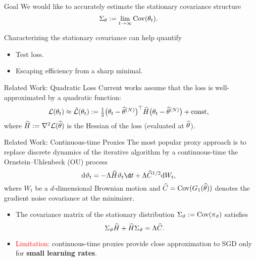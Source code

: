 \documentclass[10pt,xcolor=table]{beamer}
\begin{document}
\begin{frame}{Goal}
We would like to accurately estimate the stationary covariance structure 
\begin{equation*}
\Sigma_{\theta} \defas \lim_{t \to \infty} \text{Cov} (\theta_{t}).
\end{equation*}

Characterizing the stationary covariance can help quantify 
\begin{itemize}
     \item Test loss.
     \item Escaping efficiency from a sharp minimal. 
\end{itemize}
\end{frame}

\begin{frame}{Related Work: Quadratic Loss}
	Current works assume that the loss is well-approximated by a quadratic function:
	\begin{equation*}
		\textstyle\loss(\theta_{t}) \approx \tilde{\loss}(\theta_{t}) := \frac{1}{2} \rbra[\big]{\theta_{t}-\MLEN}^{\top} \hess \rbra[\big]{\theta_{t}-\MLEN} + \mathrm{const},
	\end{equation*}
	where $\hess \defas \grad^{2} \loss(\MLE)$ is the Hessian of the loss (evaluated at $\MLE$). 
\end{frame}

\begin{frame}{Related Work: Continuous-time Proxies}
The most popular proxy approach is to replace discrete dynamics of the iterative algorithm by a continuous-time the Ornstein--Uhlenbeck (OU) process
$$
	\dee \vartheta_{t} = -\Lambda \hess \vartheta_{t} \d t + \Lambda \widehat{C}^{1/2} \dee W_{t},
$$
where $W_{t}$ be a $d$-dimensional Brownian motion and $\widehat{C} = \cov(G_{1}(\MLE))$ denotes the gradient noise covariance at the minimizer.
\begin{itemize}
	\item The covariance matrix of the stationary distribution $\Sigma_{\vartheta} \defas \cov(\pi_{\vartheta})$ 
	satisfies 
	$$\Sigma_{\vartheta} \hess + \hess \Sigma_{\vartheta} = \Lambda \widehat{C}.$$
	\item \textcolor{red}{Limitation:} continuous-time proxies provide close approximation to SGD only for \textbf{small learning rates}.
\end{itemize}

\end{frame}
\end{document}
